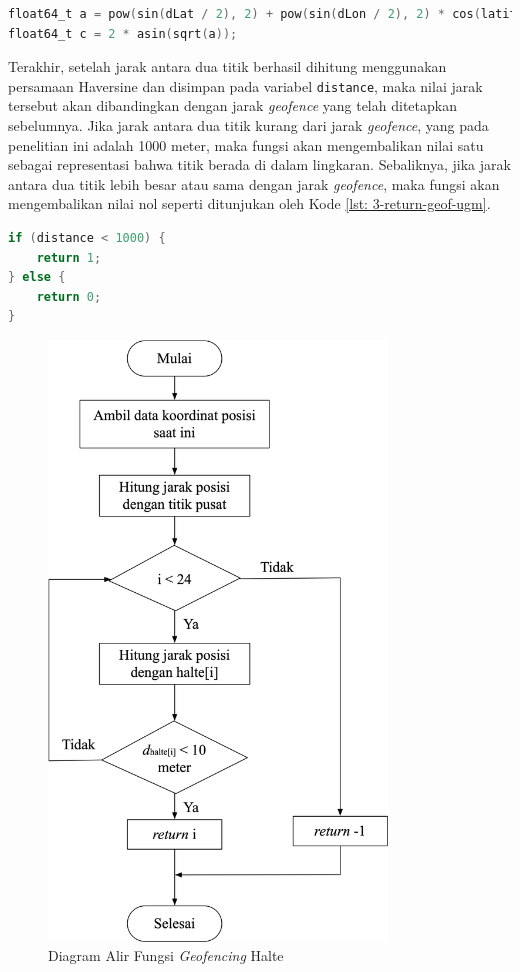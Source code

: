 \vspace{0.3cm}
\begin{lstlisting}[language=c, style=mystyle, caption={Perhitungan Jarak Antara Dua Titik dengan Persamaan Haversine}, label={lst: 3-compute-ac}]
float64_t a = pow(sin(dLat / 2), 2) + pow(sin(dLon / 2), 2) * cos(latitude) * cos(longitude);
float64_t c = 2 * asin(sqrt(a));
\end{lstlisting}

Terakhir, setelah jarak antara dua titik berhasil dihitung menggunakan persamaan Haversine dan disimpan pada variabel \texttt{distance}, maka nilai jarak tersebut akan dibandingkan dengan jarak \textit{geofence} yang telah ditetapkan sebelumnya. Jika jarak antara dua titik kurang dari jarak \textit{geofence}, yang pada penelitian ini adalah 1000 meter, maka fungsi akan mengembalikan nilai satu sebagai representasi bahwa titik berada di dalam lingkaran. Sebaliknya, jika jarak antara dua titik lebih besar atau sama dengan jarak \textit{geofence}, maka fungsi akan mengembalikan nilai nol seperti ditunjukan oleh Kode \ref{lst: 3-return-geof-ugm}.
\newpage

\vspace{0.3cm}
\begin{lstlisting}[language=c, style=mystyle, caption={\textit{Return Value} Fungsi \textit{Geofencing} Wilayah Universitas Gadjah Mada}, label={lst: 3-return-geof-ugm}]
if (distance < 1000) {
	return 1;
} else {
	return 0;
}
\end{lstlisting}

\begin{figure}[H]
	\centering
	\includegraphics[width=9cm]{contents/chapter-3/flowchart-geofencing-halte.png}
	\caption{Diagram Alir Fungsi \textit{Geofencing} Halte}
	\label{Fig: flowchart-geofencing-halte}
\end{figure}


